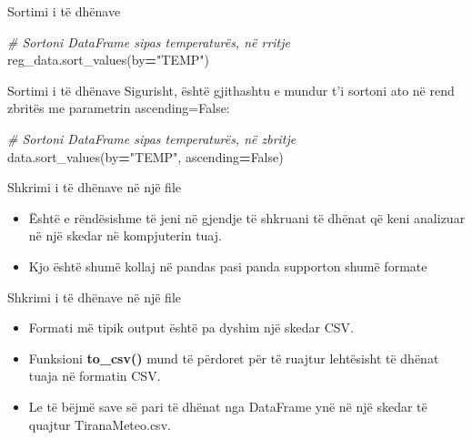 \documentclass[
  ignorenonframetext,
]{beamer}
\newenvironment{Shaded}{\begin{snugshade}}{\end{snugshade}}
\newcommand{\CommentTok}[1]{\textcolor[rgb]{0.56,0.35,0.01}{\textit{#1}}}
\newcommand{\NormalTok}[1]{#1}
\newcommand{\OperatorTok}[1]{\textcolor[rgb]{0.81,0.36,0.00}{\textbf{#1}}}
\newcommand{\StringTok}[1]{\textcolor[rgb]{0.31,0.60,0.02}{#1}}
\newcommand{\VariableTok}[1]{\textcolor[rgb]{0.00,0.00,0.00}{#1}}
\begin{document}
\begin{frame}[fragile]{Sortimi i të dhënave}
\protect\hypertarget{sortimi-i-tuxeb-dhuxebnave-2}{}
\begin{Shaded}
\begin{Highlighting}[]
\CommentTok{\# Sortoni DataFrame sipas temperaturës, në rritje}
\NormalTok{reg\_data.sort\_values(by}\OperatorTok{=}\StringTok{"TEMP"}\NormalTok{)}
\end{Highlighting}
\end{Shaded}
\end{frame}

\begin{frame}[fragile]{Sortimi i të dhënave}
\protect\hypertarget{sortimi-i-tuxeb-dhuxebnave-3}{}
Sigurisht, është gjithashtu e mundur t'i sortoni ato në rend zbritës me
parametrin ascending=False:

\begin{Shaded}
\begin{Highlighting}[]
\CommentTok{\# Sortoni DataFrame sipas temperaturës, në zbritje}
\NormalTok{data.sort\_values(by}\OperatorTok{=}\StringTok{"TEMP"}\NormalTok{, ascending}\OperatorTok{=}\VariableTok{False}\NormalTok{)}
\end{Highlighting}
\end{Shaded}
\end{frame}

\begin{frame}{Shkrimi i të dhënave në një file}
\protect\hypertarget{shkrimi-i-tuxeb-dhuxebnave-nuxeb-njuxeb-file}{}
\begin{itemize}
\item
  Është e rëndësishme të jeni në gjendje të shkruani të dhënat që keni
  analizuar në një skedar në kompjuterin tuaj.
\item
  Kjo është shumë kollaj në pandas pasi panda supporton shumë formate
\end{itemize}
\end{frame}

\begin{frame}{Shkrimi i të dhënave në një file}
\protect\hypertarget{shkrimi-i-tuxeb-dhuxebnave-nuxeb-njuxeb-file-1}{}
\begin{itemize}
\item
  Formati më tipik output është pa dyshim një skedar CSV.
\item
  Funksioni \textbf{to\_csv()} mund të përdoret për të ruajtur
  lehtësisht të dhënat tuaja në formatin CSV.
\item
  Le të bëjmë save së pari të dhënat nga DataFrame ynë në një skedar të
  quajtur TiranaMeteo.csv.
\end{itemize}
\end{frame}
\end{document}
